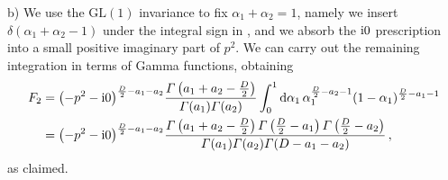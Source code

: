 \smallskip
\noindent
b) We use the $\text{GL}(1)$ invariance to fix $\alpha_1+\alpha_2=1$, namely we insert $\delta(\alpha_1+\alpha_2-1)$ under the integral sign in , and we absorb the $\mathrm{i} 0$ prescription into a small positive imaginary part of $p^2$. We can carry out the remaining integration in terms of Gamma functions, obtaining
\begin{align}
F_2 & = \bigl(-p^2-\i 0\bigr)^{\frac{D}{2}-a_1-a_2} \frac{\Gamma\left(a_1+a_2-\frac{D}{2}\right)}{\Gamma(a_1) \Gamma(a_2)} \int_{0}^{1} \d\alpha_1 \, \alpha_1^{\frac{D}{2}-a_2-1} (1-\alpha_1)^{\frac{D}{2}-a_1-1} \nonumber \\ 
& =  \bigl(-p^2-\i 0\bigr)^{\frac{D}{2}-a_1-a_2} \frac{\Gamma\left(a_1+a_2-\frac{D}{2}\right) \Gamma\left(\frac{D}{2}-a_1\right) \Gamma\left(\frac{D}{2}-a_2\right) }{\Gamma(a_1) \Gamma(a_2)  \Gamma(D - a_1 - a_2)}  \,,
\end{align}
as claimed.



